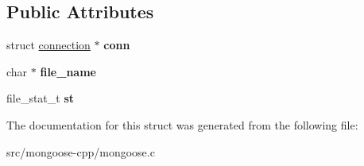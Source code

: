 \subsection*{Public Attributes}
\begin{DoxyCompactItemize}
\item 
struct \hyperlink{structconnection}{connection} $\ast$ {\bfseries conn}\hypertarget{structdir__entry_aa4c9a7128f6c2354020533cb6765dbaa}{}\label{structdir__entry_aa4c9a7128f6c2354020533cb6765dbaa}

\item 
char $\ast$ {\bfseries file\+\_\+name}\hypertarget{structdir__entry_a82a02844c430b2e3ca62ebc83059f0f6}{}\label{structdir__entry_a82a02844c430b2e3ca62ebc83059f0f6}

\item 
file\+\_\+stat\+\_\+t {\bfseries st}\hypertarget{structdir__entry_a535f766ddd8c69623b47b2c2ca2dce96}{}\label{structdir__entry_a535f766ddd8c69623b47b2c2ca2dce96}

\end{DoxyCompactItemize}


The documentation for this struct was generated from the following file\+:\begin{DoxyCompactItemize}
\item 
src/mongoose-\/cpp/mongoose.\+c\end{DoxyCompactItemize}
